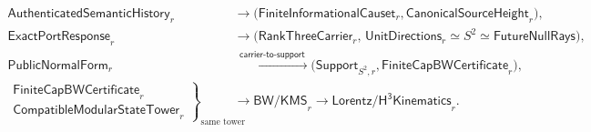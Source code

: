 \begingroup\small
\[
\begin{aligned}
\mathsf{AuthenticatedSemanticHistory}_r
&\longrightarrow
\bigl(\mathsf{FiniteInformationalCauset}_r,
\mathsf{CanonicalSourceHeight}_r\bigr),\\
\mathsf{ExactPortResponse}_r
&\longrightarrow
\bigl(\mathsf{RankThreeCarrier}_r,\,
\mathsf{UnitDirections}_r\simeq S^2\simeq\mathsf{FutureNullRays}\bigr),\\
\mathsf{PublicNormalForm}_r
&\xrightarrow{\;\mathsf{carrier\text{-}to\text{-}support}\;}
\bigl(\mathsf{Support}_{S^2,r},\mathsf{FiniteCapBWCertificate}_r\bigr),\\
\left.
\begin{gathered}
\mathsf{FiniteCapBWCertificate}_r\\
\mathsf{CompatibleModularStateTower}_r
\end{gathered}
\right\}_{\text{same tower}}
&\longrightarrow \mathsf{BW/KMS}_r
\longrightarrow \mathsf{Lorentz/H^3Kinematics}_r .
\end{aligned}
\]
